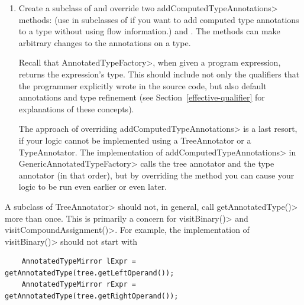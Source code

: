 \begin{enumerate}
\item
  Create a subclass of  and
  override two \<addComputedTypeAnnotations> methods:
  (use 
  in subclasses of  if you want to add computed type annotations to a type without using flow information.)
  and
  .
  The methods can make arbitrary changes to the annotations on a type.

  Recall that \<AnnotatedTypeFactory>, when given a program
  expression, returns the expression's type.  This should include not only
  the qualifiers that the programmer explicitly wrote in the source code, but
  also default annotations and type
  refinement (see Section~\ref{effective-qualifier} for explanations of these
  concepts).

  The approach of overriding \<addComputedTypeAnnotations> is a last
  resort, if your logic cannot be implemented using a TreeAnnotator or a
  TypeAnnotator.  The implementation of \<addComputedTypeAnnotations> in
  \<GenericAnnotatedTypeFactory> calls the tree annotator and the type
  annotator (in that order), but by overriding the method you can cause
  your logic to be run even earlier or even later.

\end{enumerate}



A subclass of \<TreeAnnotator> should not, in general, call
\<getAnnotatedType()> more than once.
This is primarily a concern for \<visitBinary()> and \<visitCompoundAssignment()>.
For example, the implementation of \<visitBinary()> should not start with

\begin{Verbatim}
    AnnotatedTypeMirror lExpr = getAnnotatedType(tree.getLeftOperand());
    AnnotatedTypeMirror rExpr = getAnnotatedType(tree.getRightOperand());
\end{Verbatim}

